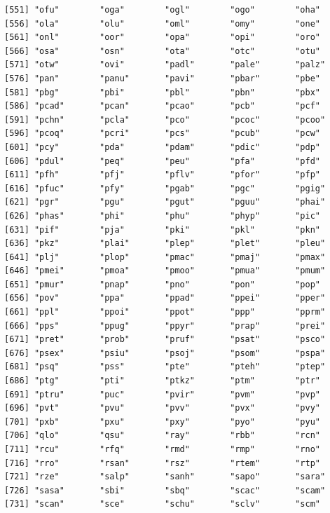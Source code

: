 \documentclass[
  letterpaper,
  DIV=11,
  numbers=noendperiod]{scrreprt}
\begin{document}
\begin{verbatim}
[551] "ofu"        "oga"        "ogl"        "ogo"        "oha"       
[556] "ola"        "olu"        "oml"        "omy"        "one"       
[561] "onl"        "oor"        "opa"        "opi"        "oro"       
[566] "osa"        "osn"        "ota"        "otc"        "otu"       
[571] "otw"        "ovi"        "padl"       "pale"       "palz"      
[576] "pan"        "panu"       "pavi"       "pbar"       "pbe"       
[581] "pbg"        "pbi"        "pbl"        "pbn"        "pbx"       
[586] "pcad"       "pcan"       "pcao"       "pcb"        "pcf"       
[591] "pchn"       "pcla"       "pco"        "pcoc"       "pcoo"      
[596] "pcoq"       "pcri"       "pcs"        "pcub"       "pcw"       
[601] "pcy"        "pda"        "pdam"       "pdic"       "pdp"       
[606] "pdul"       "peq"        "peu"        "pfa"        "pfd"       
[611] "pfh"        "pfj"        "pflv"       "pfor"       "pfp"       
[616] "pfuc"       "pfy"        "pgab"       "pgc"        "pgig"      
[621] "pgr"        "pgu"        "pgut"       "pguu"       "phai"      
[626] "phas"       "phi"        "phu"        "phyp"       "pic"       
[631] "pif"        "pja"        "pki"        "pkl"        "pkn"       
[636] "pkz"        "plai"       "plep"       "plet"       "pleu"      
[641] "plj"        "plop"       "pmac"       "pmaj"       "pmax"      
[646] "pmei"       "pmoa"       "pmoo"       "pmua"       "pmum"      
[651] "pmur"       "pnap"       "pno"        "pon"        "pop"       
[656] "pov"        "ppa"        "ppad"       "ppei"       "pper"      
[661] "ppl"        "ppoi"       "ppot"       "ppp"        "pprm"      
[666] "pps"        "ppug"       "ppyr"       "prap"       "prei"      
[671] "pret"       "prob"       "pruf"       "psat"       "psco"      
[676] "psex"       "psiu"       "psoj"       "psom"       "pspa"      
[681] "psq"        "pss"        "pte"        "pteh"       "ptep"      
[686] "ptg"        "pti"        "ptkz"       "ptm"        "ptr"       
[691] "ptru"       "puc"        "pvir"       "pvm"        "pvp"       
[696] "pvt"        "pvu"        "pvv"        "pvx"        "pvy"       
[701] "pxb"        "pxu"        "pxy"        "pyo"        "pyu"       
[706] "qlo"        "qsu"        "ray"        "rbb"        "rcn"       
[711] "rcu"        "rfq"        "rmd"        "rmp"        "rno"       
[716] "rro"        "rsan"       "rsz"        "rtem"       "rtp"       
[721] "rze"        "salp"       "sanh"       "sapo"       "sara"      
[726] "sasa"       "sbi"        "sbq"        "scac"       "scam"      
[731] "scan"       "sce"        "schu"       "sclv"       "scm"       

\end{verbatim}
\end{document}
